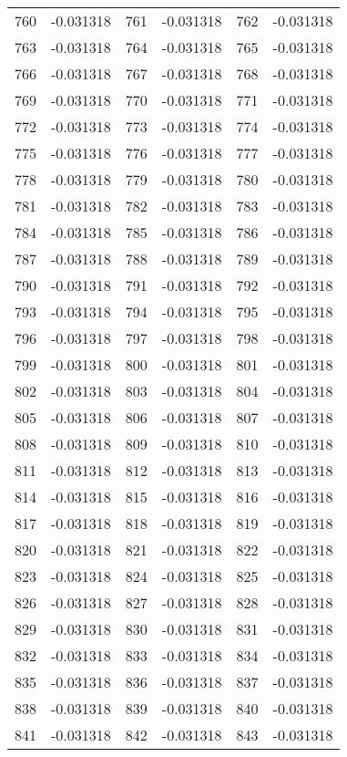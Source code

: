 \documentclass[12pt]{article}
\begin{document}
\begin{longtable}{@{}cc|cc|cc@{}}
760 & -0.031318 & 761 & -0.031318 & 762 & -0.031318 \\
763 & -0.031318 & 764 & -0.031318 & 765 & -0.031318 \\
766 & -0.031318 & 767 & -0.031318 & 768 & -0.031318 \\
769 & -0.031318 & 770 & -0.031318 & 771 & -0.031318 \\
772 & -0.031318 & 773 & -0.031318 & 774 & -0.031318 \\
775 & -0.031318 & 776 & -0.031318 & 777 & -0.031318 \\
778 & -0.031318 & 779 & -0.031318 & 780 & -0.031318 \\
781 & -0.031318 & 782 & -0.031318 & 783 & -0.031318 \\
784 & -0.031318 & 785 & -0.031318 & 786 & -0.031318 \\
787 & -0.031318 & 788 & -0.031318 & 789 & -0.031318 \\
790 & -0.031318 & 791 & -0.031318 & 792 & -0.031318 \\
793 & -0.031318 & 794 & -0.031318 & 795 & -0.031318 \\
796 & -0.031318 & 797 & -0.031318 & 798 & -0.031318 \\
799 & -0.031318 & 800 & -0.031318 & 801 & -0.031318 \\
802 & -0.031318 & 803 & -0.031318 & 804 & -0.031318 \\
805 & -0.031318 & 806 & -0.031318 & 807 & -0.031318 \\
808 & -0.031318 & 809 & -0.031318 & 810 & -0.031318 \\
811 & -0.031318 & 812 & -0.031318 & 813 & -0.031318 \\
814 & -0.031318 & 815 & -0.031318 & 816 & -0.031318 \\
817 & -0.031318 & 818 & -0.031318 & 819 & -0.031318 \\
820 & -0.031318 & 821 & -0.031318 & 822 & -0.031318 \\
823 & -0.031318 & 824 & -0.031318 & 825 & -0.031318 \\
826 & -0.031318 & 827 & -0.031318 & 828 & -0.031318 \\
829 & -0.031318 & 830 & -0.031318 & 831 & -0.031318 \\
832 & -0.031318 & 833 & -0.031318 & 834 & -0.031318 \\
835 & -0.031318 & 836 & -0.031318 & 837 & -0.031318 \\
838 & -0.031318 & 839 & -0.031318 & 840 & -0.031318 \\
841 & -0.031318 & 842 & -0.031318 & 843 & -0.031318 \\

\end{longtable}
\end{document}
